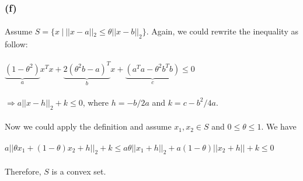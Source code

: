 \subsubsection*{(f)}
\paragraph{}
Assume $S = \{x\ | \ ||x-a||_2 \leq \theta ||x-b||_2\}$. Again, we could rewrite the inequality as follow:
\paragraph{}
$\underbrace{(1-\theta^2)}_ax^Tx +\underbrace{2(\theta^2 b -a)^T}_bx +\underbrace{(a^Ta-\theta^2 b^Tb)}_c \leq 0$
\paragraph{}
$\Rightarrow a||x-h||_2 +k \leq 0$, where $ h = -b/2a$ and $k = c-b^2/4a$. 
\paragraph{}
Now we could apply the definition and assume $x_1, x_2 \in S$ and $0 \leq \theta \leq 1$. We have
\paragraph{}
$a||\theta x_1 +(1-\theta) x_2 + h||_2 + k \leq a\theta||x_1 + h||_2 + a(1-\theta)||x_2 +h|| +k \leq 0$
\paragraph{}
Therefore, $S$ is a convex set.
